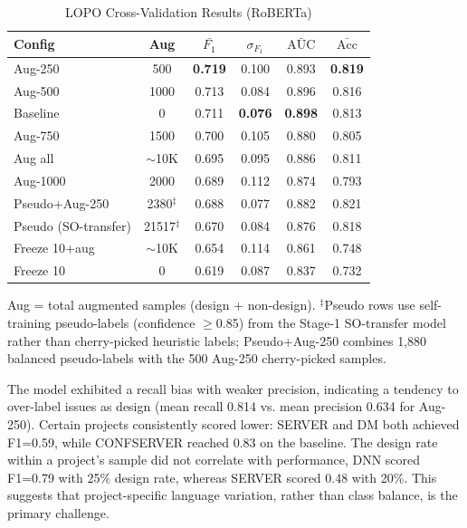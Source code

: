 \documentclass[preprint,12pt]{elsarticle}
\begin{document}
\begin{table}[t]
\centering
\setlength{\tabcolsep}{3pt}
\begin{tabular}{lccccc}
\toprule
\textbf{Config} & \textbf{Aug} & \textbf{$\bar{F_1}$} & \textbf{$\sigma_{F_1}$} & \textbf{$\bar{\text{AUC}}$} & \textbf{$\bar{\text{Acc}}$} \\
\midrule
Aug-250 & 500 & \textbf{0.719} & 0.100 & 0.893 & \textbf{0.819} \\
Aug-500 & 1000 & 0.713 & 0.084 & 0.896 & 0.816 \\
Baseline & 0 & 0.711 & \textbf{0.076} & \textbf{0.898} & 0.813 \\
Aug-750 & 1500 & 0.700 & 0.105 & 0.880 & 0.805 \\
Aug all & $\sim$10K & 0.695 & 0.095 & 0.886 & 0.811 \\
Aug-1000 & 2000 & 0.689 & 0.112 & 0.874 & 0.793 \\
Pseudo+Aug-250 & 2380$^\ddagger$ & 0.688 & 0.077 & 0.882 & 0.821 \\
Pseudo (SO-transfer) & 21517$^\ddagger$ & 0.670 & 0.084 & 0.876 & 0.818 \\
Freeze 10+aug & $\sim$10K & 0.654 & 0.114 & 0.861 & 0.748 \\
Freeze 10 & 0 & 0.619 & 0.087 & 0.837 & 0.732 \\
\bottomrule
\end{tabular}
\caption{LOPO Cross-Validation Results (RoBERTa)}
\label{tab:lopo}
\begin{flushleft}
\footnotesize Aug = total augmented samples (design + non-design). $^\ddagger$Pseudo rows use self-training pseudo-labels (confidence $\geq$0.85) from the Stage-1 SO-transfer model rather than cherry-picked heuristic labels; Pseudo+Aug-250 combines 1,880 balanced pseudo-labels with the 500 Aug-250 cherry-picked samples.
\end{flushleft}
\end{table}

The model exhibited a recall bias with weaker precision, indicating a tendency to over-label issues as design (mean recall 0.814 vs. mean precision 0.634 for Aug-250). Certain projects consistently scored lower: SERVER and DM both achieved F1=0.59, while CONFSERVER reached 0.83 on the baseline. The design rate within a project's sample did not correlate with performance, DNN scored F1=0.79 with 25\% design rate, whereas SERVER scored 0.48 with 20\%. This suggests that project-specific language variation, rather than class balance, is the primary challenge.
\end{document}
